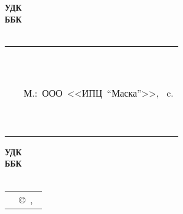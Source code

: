 {
\thispagestyle{empty}
%
\small{
\begin{flushleft}
\textbf{%
	УДК \UDK \\
	ББК \BBK \\
	\BibCode \\
}
\end{flushleft}
%
\vspace{3cm}
%
\begin{flushright}
{
\begin{tabular}[c]{>{\raggedright}m{14mm} >{\raggedright}m{95mm} }
	\textbf{\BibCode} & \MyVarAuthorName \tabularnewline
	~ & \MyVarBookName \tabularnewline
	~ & \MyVarBookNamesec \tabularnewline
	~ & М.:~ООО~<<ИПЦ~"`Маска"'>>,~\year\mdash \pageref{LastPage} c. \tabularnewline	
	~ & \textbf{\ISBN} \tabularnewline
	~ & \ciao{16+}
\end{tabular}
}
\end{flushright}
%
\vspace{3.0cm}%
%
\begin{flushright}
\textbf{%
	УДК \UDK \\
	ББК \BBK \\
	\BibCode \\
}
\end{flushright}
%
\vspace{1.0cm}
%
}
{
\begin{longtable}[c]{>{\raggedright}m{55mm} >{\raggedleft}m{55mm} }
	\textbf{\ISBN} & {\copyright~\MyVarAuthorName,~\year} \tabularnewline
\end{longtable}
}
}